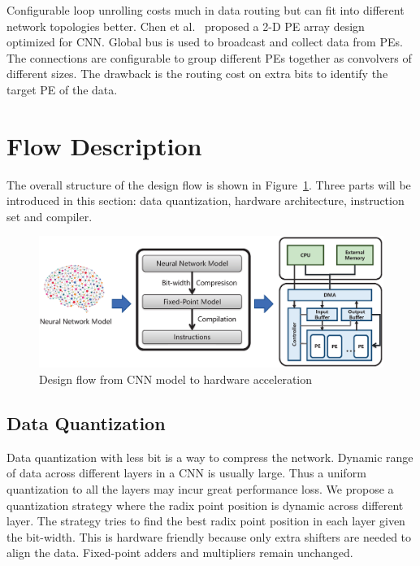 \documentclass[10pt, conference, compsocconf]{IEEEtran}
\begin{document}
Configurable loop unrolling costs much in data routing but can fit into different network topologies better. Chen et al.~\cite{chen2016eyeriss} proposed a 2-D PE array design optimized for CNN. Global bus is used to broadcast and collect data from PEs. The connections are configurable to group different PEs together as convolvers of different sizes. The drawback is the routing cost on extra bits to identify the target PE of the data.


\section{Flow Description}\label{sec:flow}
The overall structure of the design flow is shown in Figure~\ref{fig:flow}. Three parts will be introduced in this section: data quantization, hardware architecture, instruction set and compiler.

\begin{figure}[t]
  \centering
  \includegraphics[width=1.0\columnwidth]{figure/figure1.eps}
  \small
  \caption{Design flow from CNN model to hardware acceleration}
  \label{fig:flow}
\end{figure}

\subsection{Data Quantization}
Data quantization with less bit is a way to compress the network. Dynamic range of data across different layers in a CNN is usually large. Thus a uniform quantization to all the layers may incur great performance loss. We propose a quantization strategy where the radix point position is dynamic across different layer. The strategy tries to find the best radix point position in each layer given the bit-width. This is hardware friendly because only extra shifters are needed to align the data. Fixed-point adders and multipliers remain unchanged.
\end{document}
